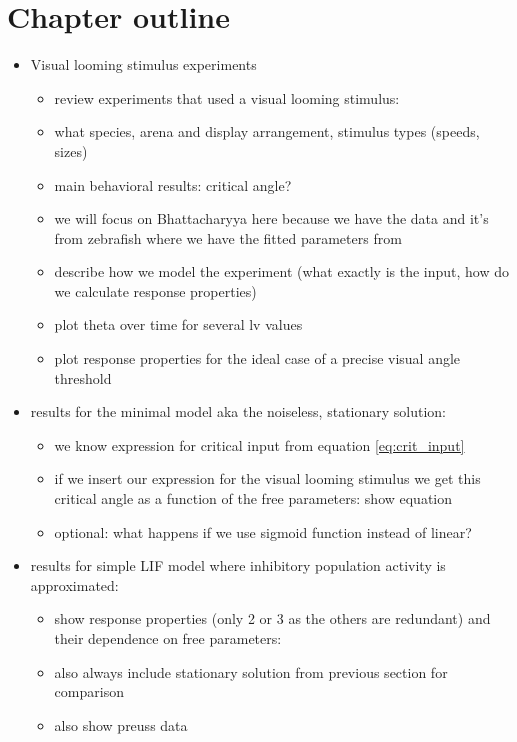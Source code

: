 \documentclass[a4paper,10pt,hidelinks]{scrreprt}
\begin{document}
	\section{Chapter outline}
	\begin{itemize}
		\item Visual looming stimulus experiments
		\begin{itemize}
			\item review experiments that used a visual looming stimulus:
			\item what species, arena and display arrangement, stimulus types (speeds, sizes)
			\item main behavioral results: critical angle?
			\item we will focus on Bhattacharyya here because we have the data and it's from 
			zebrafish where we have the fitted parameters from \cite{Koyama2016}
			\item describe how we model the experiment (what exactly is the input, how do we 
			calculate response properties)
			\item plot theta over time for several lv values
			\item plot response properties for the ideal case of a precise visual angle threshold
		\end{itemize}
		\item results for the minimal model aka the noiseless, stationary solution:
		\begin{itemize}
			\item we know expression for critical input from equation \ref{eq:crit_input}
			\item if we insert our expression for the visual looming stimulus we get this critical 
			angle as a function of the free parameters: show equation
			\item optional: what happens if we use sigmoid function instead of linear?
		\end{itemize}
		\item results for simple LIF model where inhibitory population activity is approximated:
		\begin{itemize}
			\item show response properties (only 2 or 3 as the others are redundant) and their 
			dependence on free parameters: 
			\item also always include stationary solution from previous section for comparison
			\item also show preuss data
		\end{itemize}

\end{itemize}
\end{document}
